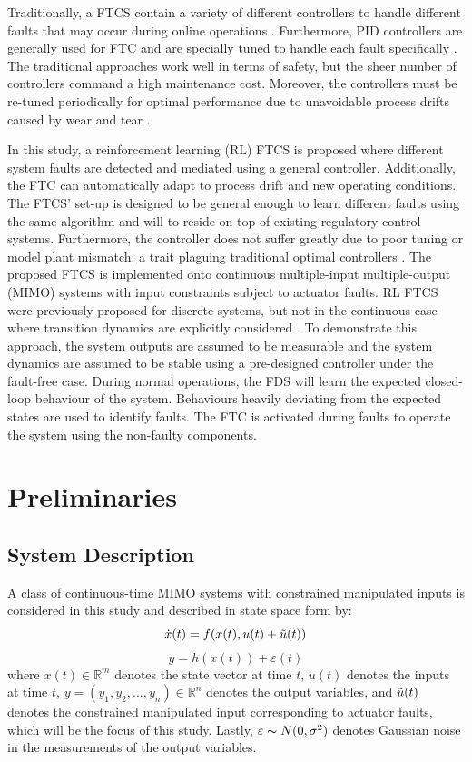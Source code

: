 Traditionally, a FTCS contain a variety of different controllers to handle different faults that may occur during online operations \cite{ftc_book_ref1}. Furthermore, PID controllers are generally used for FTC and are specially tuned to handle each fault specifically \cite{process_faults}. The traditional approaches work well in terms of safety, but the sheer number of controllers command a  high maintenance cost.  Moreover, the controllers must be re-tuned periodically for optimal performance due to unavoidable process drifts caused by wear and tear \cite{process_control_ref13}.

In this study, a reinforcement learning (RL) FTCS is proposed where different system faults are detected and mediated using a general controller. Additionally, the FTC can automatically adapt to process drift and new operating conditions. The FTCS' set-up is designed to be general enough to learn different faults using the same algorithm and will to reside on top of existing regulatory control systems.  Furthermore, the controller does not suffer greatly due to poor tuning or model plant mismatch; a trait plaguing traditional optimal controllers \cite{model_plant_mismatch}.  The proposed FTCS is implemented onto continuous multiple-input multiple-output (MIMO) systems with input constraints subject to actuator faults. RL FTCS were previously proposed for discrete systems, but not in the continuous case where transition dynamics are explicitly considered \cite{ftc_ex2_ref5, ftc_ex1_ref6}. To demonstrate this approach, the system outputs are assumed to be measurable and the system dynamics are assumed to be stable using a pre-designed controller under the fault-free case.  During normal operations, the FDS will learn the expected closed-loop behaviour of the system.  Behaviours heavily deviating from the expected states are used to identify faults. The FTC is activated during faults to operate the system using the non-faulty components.

\section{Preliminaries}
\subsection{System Description}
A class of continuous-time MIMO systems with constrained manipulated inputs is considered in this study and described in state space form by:
\begin{equation}
\dot{x}(t) = f(x(t), u(t) + \Tilde{u}(t))
\label{eq:system_states}
\end{equation}
\begin{equation}
y = h(x(t)) + \varepsilon(t)
\label{eq:system_output}
\end{equation}
where $x(t) \in {\mathbb{R}}^m$ denotes the state vector at time $t$, $u(t)$ denotes the inputs at time $t$, $y = (y_{1}, y_{2}, ..., y_{n}) \in {\mathbb{R}}^n$ denotes the output variables, and $\Tilde{u}(t)$ denotes the constrained manipulated input corresponding to actuator faults, which will be the focus of this study. Lastly, $\varepsilon \thicksim N(0, \sigma^2)$ denotes Gaussian noise in the measurements of the output variables.

